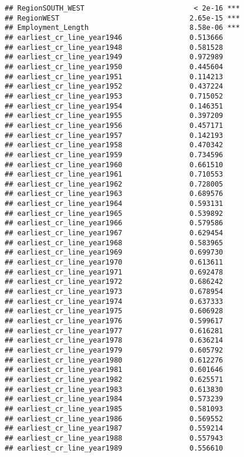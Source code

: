 \documentclass[]{article}
\begin{document}
\begin{verbatim}
## RegionSOUTH_WEST                          < 2e-16 ***
## RegionWEST                               2.65e-15 ***
## Employment_Length                        8.58e-06 ***
## earliest_cr_line_year1946                0.513666    
## earliest_cr_line_year1948                0.581528    
## earliest_cr_line_year1949                0.972989    
## earliest_cr_line_year1950                0.445604    
## earliest_cr_line_year1951                0.114213    
## earliest_cr_line_year1952                0.437224    
## earliest_cr_line_year1953                0.715052    
## earliest_cr_line_year1954                0.146351    
## earliest_cr_line_year1955                0.397209    
## earliest_cr_line_year1956                0.457171    
## earliest_cr_line_year1957                0.142193    
## earliest_cr_line_year1958                0.470342    
## earliest_cr_line_year1959                0.734596    
## earliest_cr_line_year1960                0.661510    
## earliest_cr_line_year1961                0.710553    
## earliest_cr_line_year1962                0.728005    
## earliest_cr_line_year1963                0.689576    
## earliest_cr_line_year1964                0.593131    
## earliest_cr_line_year1965                0.539892    
## earliest_cr_line_year1966                0.579586    
## earliest_cr_line_year1967                0.629454    
## earliest_cr_line_year1968                0.583965    
## earliest_cr_line_year1969                0.699730    
## earliest_cr_line_year1970                0.613611    
## earliest_cr_line_year1971                0.692478    
## earliest_cr_line_year1972                0.686242    
## earliest_cr_line_year1973                0.678954    
## earliest_cr_line_year1974                0.637333    
## earliest_cr_line_year1975                0.606928    
## earliest_cr_line_year1976                0.599617    
## earliest_cr_line_year1977                0.616281    
## earliest_cr_line_year1978                0.636214    
## earliest_cr_line_year1979                0.605792    
## earliest_cr_line_year1980                0.612276    
## earliest_cr_line_year1981                0.601646    
## earliest_cr_line_year1982                0.625571    
## earliest_cr_line_year1983                0.613830    
## earliest_cr_line_year1984                0.573239    
## earliest_cr_line_year1985                0.581093    
## earliest_cr_line_year1986                0.569552    
## earliest_cr_line_year1987                0.559214    
## earliest_cr_line_year1988                0.557943    
## earliest_cr_line_year1989                0.556610    

\end{verbatim}
\end{document}
